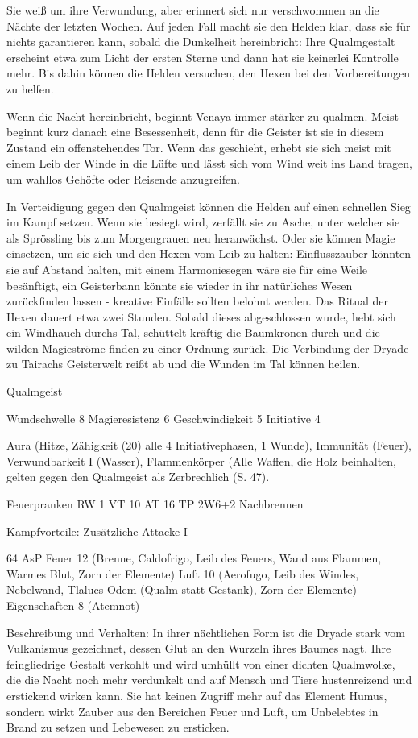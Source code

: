 Sie weiß um ihre Verwundung, aber erinnert sich nur verschwommen an die Nächte der letzten Wochen. Auf jeden Fall macht sie den Helden klar, dass sie für nichts garantieren kann, sobald die Dunkelheit hereinbricht: Ihre Qualmgestalt erscheint etwa zum Licht der ersten Sterne und dann hat sie keinerlei Kontrolle mehr. Bis dahin können die Helden versuchen, den Hexen bei den Vorbereitungen zu helfen.


Wenn die Nacht hereinbricht, beginnt Venaya immer stärker zu qualmen. Meist beginnt kurz danach eine Besessenheit, denn für die Geister ist sie in diesem Zustand ein offenstehendes Tor. Wenn das geschieht, erhebt sie sich meist mit einem Leib der Winde in die Lüfte und lässt sich vom Wind weit ins Land tragen, um wahllos Gehöfte oder Reisende anzugreifen.


In Verteidigung gegen den Qualmgeist können die Helden auf einen schnellen Sieg im Kampf setzen. Wenn sie besiegt wird, zerfällt sie zu Asche, unter welcher sie als Sprössling bis zum Morgengrauen neu heranwächst.
Oder sie können Magie einsetzen, um sie sich und den Hexen vom Leib zu halten: Einflusszauber könnten sie auf Abstand halten, mit einem Harmoniesegen wäre sie für eine Weile besänftigt, ein Geisterbann könnte sie wieder in ihr natürliches Wesen zurückfinden lassen - kreative Einfälle sollten belohnt werden.
Das Ritual der Hexen dauert etwa zwei Stunden. Sobald dieses abgeschlossen wurde, hebt sich ein Windhauch durchs Tal, schüttelt kräftig die Baumkronen durch und die wilden Magieströme finden zu einer Ordnung zurück. Die Verbindung der Dryade zu Tairachs Geisterwelt reißt ab und die Wunden im Tal können heilen.


Qualmgeist

Wundschwelle 8
Magieresistenz 6
Geschwindigkeit 5
Initiative 4

Aura (Hitze, Zähigkeit (20) alle 4 Initiativephasen, 1 Wunde), Immunität (Feuer), Verwundbarkeit I (Wasser), Flammenkörper (Alle Waffen, die Holz beinhalten, gelten gegen den Qualmgeist als Zerbrechlich (S. 47).

Feuerpranken	RW 1	VT 10	AT 16	TP 2W6+2
	Nachbrennen

Kampfvorteile: Zusätzliche Attacke I

64 AsP
Feuer 		12 	(Brenne, Caldofrigo, Leib des Feuers, Wand aus Flammen, Warmes Blut, Zorn der Elemente)
Luft 		10 	(Aerofugo, Leib des Windes, Nebelwand, Tlalucs Odem (Qualm statt Gestank), Zorn der Elemente)
Eigenschaften 	8	(Atemnot)

Beschreibung und Verhalten:
In ihrer nächtlichen Form ist die Dryade stark vom Vulkanismus gezeichnet, dessen Glut an den Wurzeln ihres Baumes nagt. Ihre feingliedrige Gestalt verkohlt und wird umhüllt von einer dichten Qualmwolke, die die Nacht noch mehr verdunkelt und auf Mensch und Tiere hustenreizend und erstickend wirken kann. Sie hat keinen Zugriff mehr auf das Element Humus, sondern wirkt Zauber aus den Bereichen Feuer und Luft, um Unbelebtes in Brand zu setzen und Lebewesen zu ersticken.


